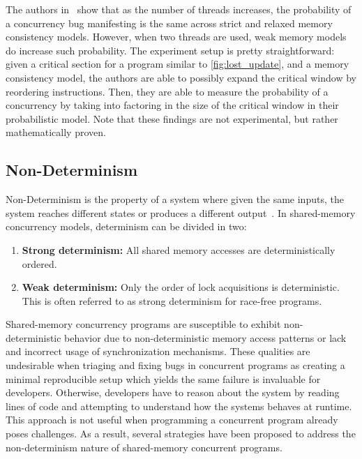 The authors in~\cite{jaffe2011impactOfMemoryModels} show that
as the number of threads increases, the probability
of a concurrency bug manifesting is the same across strict and relaxed
memory consistency models. However, when two threads are used,
weak memory models do increase such probability. The experiment setup
is pretty straightforward: given a critical section for a program
similar to \autoref{fig:lost_update}, and a
memory consistency model, the authors are able to possibly
expand the critical window by reordering instructions.
Then, they are able to measure the probability of a concurrency
by taking into factoring in the size of the critical window
in their probabilistic model.
Note that these findings are not experimental, but rather
mathematically proven.


\subsection{Non-Determinism}

Non-Determinism is the property of a system
where given the same inputs, the system
reaches different states or produces
a different output~\cite{replayDeterminism}.
In shared-memory concurrency models, determinism can be divided in two:

\begin{enumerate}
    \item \textbf{Strong determinism:} All shared memory accesses are deterministically ordered.
    \item \textbf{Weak determinism:} Only the order of lock acquisitions is deterministic.
        This is often referred to as strong determinism for race-free programs.
\end{enumerate}

Shared-memory concurrency programs are susceptible
to exhibit non-deterministic behavior due to
non-deterministic memory access patterns
or lack and incorrect usage of synchronization mechanisms.
These qualities are undesirable when triaging
and fixing bugs in concurrent programs as
creating a minimal reproducible setup which
yields the same failure is invaluable for developers.
Otherwise, developers have to reason about the system
by reading lines of code and attempting
to understand how the systems behaves at runtime. This
approach is not useful when programming a concurrent
program already poses challenges. As a result, several strategies have been proposed
to address the non-determinism nature of
shared-memory concurrent programs.

